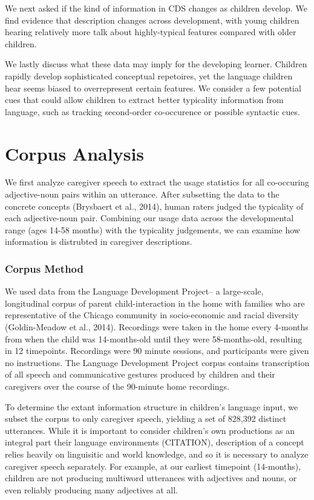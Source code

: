 \documentclass[10pt, letterpaper]{article}
\begin{document}
We next asked if the kind of information in CDS changes as children
develop. We find evidence that description changes across development,
with young children hearing relatively more talk about highly-typical
features compared with older children.

We lastly discuss what these data may imply for the developing learner.
Children rapidly develop sophisticated conceptual repetoires, yet the
language children hear seems biased to overrepresent certain features.
We consider a few potential cues that could allow children to extract
better typicality information from language, such as tracking
second-order co-occurence or possible syntactic cues.

\hypertarget{corpus-analysis}{%
\section{Corpus Analysis}\label{corpus-analysis}}

We first analyze caregiver speech to extract the usage statistics for
all co-occuring adjective-noun pairs within an utterance. After
subsetting the data to the concrete concepts (Brysbaert et al., 2014),
human raters judged the typicality of each adjective-noun pair.
Combining our usage data across the developmental range (ages 14-58
months) with the typicality judgements, we can examine how information
is distrubted in caregiver descriptions.

\hypertarget{corpus-method}{%
\subsubsection{Corpus Method}\label{corpus-method}}

We used data from the Language Development Project-- a large-scale,
longitudinal corpus of parent child-interaction in the home with
families who are representative of the Chicago community in
socio-economic and racial diversity (Goldin-Meadow et al., 2014).
Recordings were taken in the home every 4-months from when the child was
14-months-old until they were 58-months-old, resulting in 12 timepoints.
Recordings were 90 minute sessions, and participants were given no
instructions. The Language Development Project corpus contains
transcription of all speech and communicative gestures produced by
children and their caregivers over the course of the 90-minute home
recordings.

To determine the extant information structure in children's language
input, we subset the corpus to only caregiver speech, yielding a set of
828,392 distinct utterances. While it is important to consider
children's own productions as an integral part their language
environments (CITATION), description of a concept relies heavily on
linguisitic and world knowledge, and so it is necessary to analyze
caregiver speech separately. For example, at our earliest timepoint
(14-months), children are not producing multiword utterances with
adjectives and nouns, or even reliably producing many adjectives at all.
\end{document}
